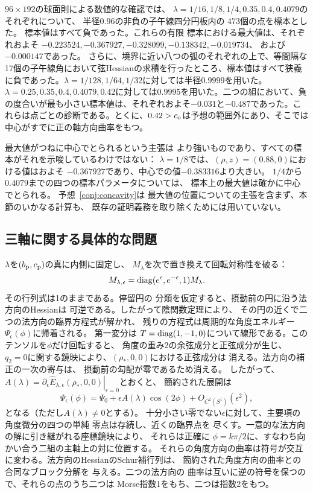 $96\times192$の球面則による数値的な確認では、
$\lambda=1/16,1/8,1/4,0.35,0.4,0.4079$のそれぞれについて、
半径$0.96$の非負の子午線四分円板内の
473個の点を標本とした。
標本値はすべて負であった。これらの有限
標本における最大値は、それぞれおよそ
$-0.223524,-0.367927,-0.328099,-0.138342,-0.019734$、
および$-0.000147$であった。
さらに、境界に近い八つの弧のそれぞれの上で、等間隔な17個の子午線角において弦Hessianの求積を行ったところ、標本値はすべて狭義に負であった。$\lambda=1/128,1/64,1/32$に対しては半径$0.9999$を用いた。$\lambda=0.25,0.35,0.4,0.4079,0.42$に対しては$0.9995$を用いた。二つの組において、負の度合いが最も小さい標本値は、それぞれおよそ$-0.031$と$-0.487$であった。これらは点ごとの診断である。とくに、$0.42>c_{\mathrm o}$は予想の範囲外にあり、そこでは中心がすでに正の軸方向曲率をもつ。

最大値がつねに中心でとられるという主張は
より強いものであり、すべての標本がそれを示唆しているわけではない：
$\lambda=1/8$では、$(\rho,z)=(0.88,0)$における値はおよそ
$-0.367927$であり、中心での値$-0.383316$より大きい。
$1/4$から$0.4079$までの四つの標本パラメータについては、
標本上の最大値は確かに中心でとられる。
予想~\ref{conj:concavity}は
最大値の位置についての主張を含まず、本節のいかなる計算も、
既存の証明義務を取り除くためには用いていない。

\subsection{三軸に関する具体的な問題}

$\lambda$を$(b_{\mathrm p},c_{\mathrm p})$の真に内側に固定し、
$M_\lambda$を次で置き換えて回転対称性を破る：
\[
 M_{\lambda,\epsilon}
 =\operatorname{diag}(e^\epsilon,e^{-\epsilon},1)M_\lambda.
\]
その行列式は1のままである。停留円の
分類を仮定すると、摂動前の円に沿う法方向のHessianは
可逆である。したがって陰関数定理により、
その円の近くで二つの法方向の臨界方程式が解かれ、
残りの方程式は周期的な角度エネルギー
$\Psi_\epsilon(\phi)$に帰着される。
第一変分は
$T=\operatorname{diag}(1,-1,0)$について線形である。このテンソルを$\phi$だけ回転すると、
角度の重み2の余弦成分と正弦成分が生じ、
$q_2=0$に関する鏡映により、$(\rho_*,0,0)$における正弦成分は
消える。法方向の補正の一次の寄与は、
摂動前の勾配が零であるため消える。
したがって、
$A(\lambda)=\left.\partial_\epsilon
\widehat E_{\lambda,\epsilon}(\rho_*,0,0)\right|_{\epsilon=0}$とおくと、
簡約された展開は
\[
 \Psi_\epsilon(\phi)
 =\Psi_0+\epsilon A(\lambda)\cos(2\phi)
   +O_{C^2(S^1)}(\epsilon^2),
\]
となる（ただし$A(\lambda)\ne0$とする）。
十分小さい零でない$\epsilon$に対して、主要項の角度微分の四つの単純
零点は存続し、近くの臨界点を
尽くす。一意的な法方向の解に引き継がれる座標鏡映により、
それらは正確に
$\phi=k\pi/2$に、すなわち向かい合う二組の主軸上の対に位置する。
それらの角度方向の曲率は符号が交互に変わる。法方向のHessianのSchur補行列は、
簡約された角度方向の曲率との合同なブロック分解を
与える。二つの法方向の
曲率は互いに逆の符号を保つので、それらの点のうち二つは
Morse指数1をもち、二つは指数2をもつ。

